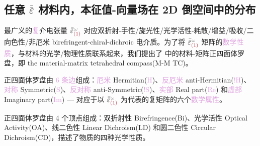 \subsection{任意 \texorpdfstring{$\bar{\bar{\varepsilon}}$}{$\bar{\bar{\text{ε}}}$} 材料内，本征值-向量场在 2D 倒空间中的分布}\label{ssec:2D-reciprocal-eigensystems}

最广义的\textcolor{Plum}{复}介电张量 $\bar{\bar{\varepsilon}}^{\;\! \mathcolor{gray}{\omega}}_{\textcolor{Maroon}{(1)}}$ 对应\textcolor{NavyBlue}{双折射-手性/旋光性/光学活性-耗散/增益/吸收/二向色性/非厄米} birefringent-chiral-dichroic 电介质\cite{samlanChiralDynamicsExceptional2018}。为了将 $\bar{\bar{\varepsilon}}^{\;\! \mathcolor{gray}{\omega}}_{\textcolor{Maroon}{(1)}}$ 矩阵的\textcolor{Plum}{数学性质}，与材料的\textcolor{NavyBlue}{光学}/\textcolor{NavyBlue}{物理性质}联系起来，我们提出了  中的\textcolor{NavyBlue}{材料-矩阵正四面体罗盘}，即 the material-matrix tetrahedral compass(\textcolor{NavyBlue}{M-M TC})。

\textcolor{NavyBlue}{正四面体罗盘}由 \textcolor{Plum}{6 条边}组成：\textcolor{Plum}{厄米} Hermitian(\textcolor{Plum}{H})、\textcolor{Plum}{反厄米} anti-Hermitian(\textcolor{Plum}{$!$H})、\textcolor{Plum}{对称} Symmetric(\textcolor{Plum}{S})、\textcolor{Plum}{反对称} anti-Symmetric(\textcolor{Plum}{$!$S})、\textcolor{Plum}{实部} Real part(\textcolor{Plum}{Re}) 和\textcolor{Plum}{虚部} Imaginary part(\textcolor{Plum}{Im}) --- 对应于以 $\bar{\bar{\varepsilon}}^{\;\! \mathcolor{gray}{\omega}}_{\textcolor{Maroon}{(1)}}$ 为代表的复矩阵的六个\textcolor{Plum}{数学属性}。

\textcolor{NavyBlue}{正四面体罗盘}由 \textcolor{NavyBlue}{4 个顶点}组成：\textcolor{NavyBlue}{双折射性} Birefringence(\textcolor{NavyBlue}{Bi})、\textcolor{NavyBlue}{光学活性} Optical Activity(\textcolor{NavyBlue}{OA})、\textcolor{NavyBlue}{线二色性} Linear Dichroism(\textcolor{NavyBlue}{LD}) 和\textcolor{NavyBlue}{圆二色性} Circular Dichroism(\textcolor{NavyBlue}{CD})，描述了物质的四种\textcolor{NavyBlue}{光学性质}。

